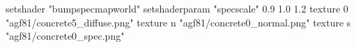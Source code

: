 setshader "bumpspecmapworld"
setshaderparam "specscale" 0.9 1.0 1.2
    texture 0 "agf81/concrete5_diffuse.png"
    texture n "agf81/concrete0_normal.png"
    texture s "agf81/concrete0_spec.png"